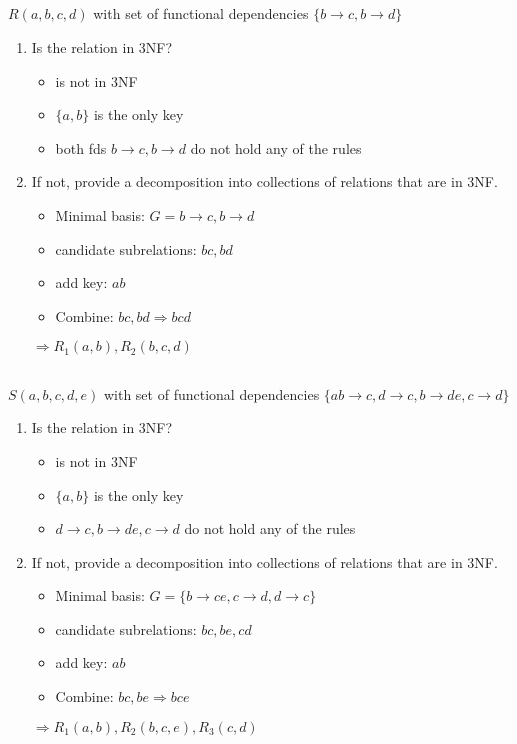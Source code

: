\documentclass{article}
\begin{document}
\subsection*{} $R(a, b, c, d)$ with set of functional dependencies $\{b \rightarrow c, b \rightarrow d\}$
\begin{enumerate}
    \item Is the relation in 3NF?
        \begin{itemize}
            \item is not in 3NF
            \item $\{a, b\}$ is the only key
            \item both fds ${b \rightarrow c, b \rightarrow d}$ do not hold any of the rules
        \end{itemize}
    \item If not, provide a decomposition into collections of relations that are in 3NF.
        \begin{itemize}
            \item Minimal basis: $G = {b \rightarrow c, b \rightarrow d}$
            \item candidate subrelations: $bc, bd$
            \item add key: $ab$
            \item Combine: $bc, bd \Rightarrow bcd$
        \end{itemize}
    $\Rightarrow R_{1}(a,b), R_{2}(b, c, d)$
\end{enumerate}

\subsection*{} $S(a, b, c, d, e)$ with set of functional dependencies $\{ab \rightarrow c, d \rightarrow c, b \rightarrow de, c \rightarrow d\}$
\begin{enumerate}
    \item Is the relation in 3NF?
    \begin{itemize}
        \item is not in 3NF
        \item $\{a, b\}$ is the only key
        \item ${d \rightarrow c, b \rightarrow de, c \rightarrow d}$ do not hold any of the rules
    \end{itemize}
    \item If not, provide a decomposition into collections of relations that are in 3NF.
        \begin{itemize}
            \item Minimal basis: $G = \{b \rightarrow ce, c \rightarrow d, d \rightarrow c\}$
            \item candidate subrelations: $bc, be, cd$
            \item add key: $ab$ 
            \item Combine: $bc, be \Rightarrow bce$
        \end{itemize}
    $\Rightarrow R_{1}(a,b), R_{2}(b, c, e), R_{3}(c, d)$
\end{enumerate}
\end{document}
